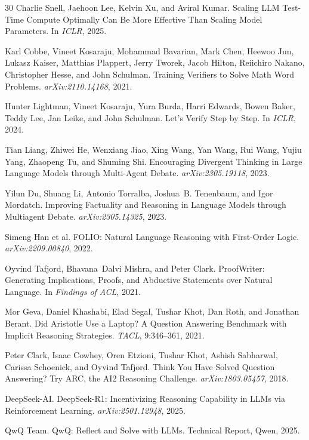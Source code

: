 \documentclass[11pt,a4paper]{article}
\begin{document}
\begin{thebibliography}{30}
Charlie Snell, Jaehoon Lee, Kelvin Xu, and Aviral Kumar.
Scaling LLM Test-Time Compute Optimally Can Be More Effective Than Scaling Model Parameters.
In {\em ICLR}, 2025.

Karl Cobbe, Vineet Kosaraju, Mohammad Bavarian, Mark Chen, Heewoo Jun, Lukasz Kaiser, Matthias Plappert, Jerry Tworek, Jacob Hilton, Reiichiro Nakano, Christopher Hesse, and John Schulman.
Training Verifiers to Solve Math Word Problems.
{\em arXiv:2110.14168}, 2021.

Hunter Lightman, Vineet Kosaraju, Yura Burda, Harri Edwards, Bowen Baker, Teddy Lee, Jan Leike, and John Schulman.
Let's Verify Step by Step.
In {\em ICLR}, 2024.

Tian Liang, Zhiwei He, Wenxiang Jiao, Xing Wang, Yan Wang, Rui Wang, Yujiu Yang, Zhaopeng Tu, and Shuming Shi.
Encouraging Divergent Thinking in Large Language Models through Multi-Agent Debate.
{\em arXiv:2305.19118}, 2023.

Yilun Du, Shuang Li, Antonio Torralba, Joshua~B. Tenenbaum, and Igor Mordatch.
Improving Factuality and Reasoning in Language Models through Multiagent Debate.
{\em arXiv:2305.14325}, 2023.

Simeng Han et al.
FOLIO: Natural Language Reasoning with First-Order Logic.
{\em arXiv:2209.00840}, 2022.

Oyvind Tafjord, Bhavana~Dalvi Mishra, and Peter Clark.
ProofWriter: Generating Implications, Proofs, and Abductive Statements over Natural Language.
In {\em Findings of ACL}, 2021.

Mor Geva, Daniel Khashabi, Elad Segal, Tushar Khot, Dan Roth, and Jonathan Berant.
Did Aristotle Use a Laptop? A Question Answering Benchmark with Implicit Reasoning Strategies.
{\em TACL}, 9:346--361, 2021.

Peter Clark, Isaac Cowhey, Oren Etzioni, Tushar Khot, Ashish Sabharwal, Carissa Schoenick, and Oyvind Tafjord.
Think You Have Solved Question Answering? Try ARC, the AI2 Reasoning Challenge.
{\em arXiv:1803.05457}, 2018.

DeepSeek-AI.
DeepSeek-R1: Incentivizing Reasoning Capability in LLMs via Reinforcement Learning.
{\em arXiv:2501.12948}, 2025.

QwQ Team.
QwQ: Reflect and Solve with LLMs.
Technical Report, Qwen, 2025.


\end{thebibliography}
\end{document}
